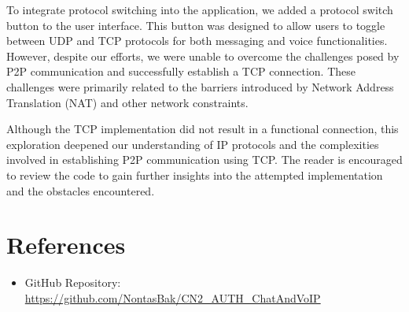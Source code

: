 \documentclass{article}
\begin{document}
To integrate protocol switching into the application, we added a protocol switch button to the user interface. This button was designed to allow users to toggle between UDP and TCP protocols for both messaging and voice functionalities. However, despite our efforts, we were unable to overcome the challenges posed by P2P communication and successfully establish a TCP connection. These challenges were primarily related to the barriers introduced by Network Address Translation (NAT) and other network constraints.

Although the TCP implementation did not result in a functional connection, this exploration deepened our understanding of IP protocols and the complexities involved in establishing P2P communication using TCP. The reader is encouraged to review the code to gain further insights into the attempted implementation and the obstacles encountered.


\section{References}
\begin{itemize}
    \item GitHub Repository: \url{https://github.com/NontasBak/CN2_AUTH_ChatAndVoIP}
\end{itemize}
\end{document}
